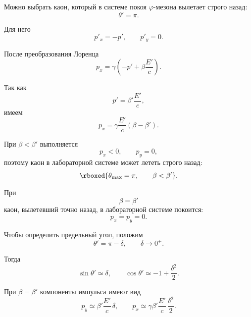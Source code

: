 \documentclass[../final.tex]{subfiles}
\begin{document}
Можно выбрать каон, который в системе покоя $\varphi$-мезона
вылетает строго назад:
%
\begin{equation*}
    \theta'=\pi.
\end{equation*}

Для него
%
\begin{equation*}
    p'_x=-p',
    \qquad
    p'_y=0.
\end{equation*}

После преобразования Лоренца
%
\begin{equation*}
    p_x
    =
    \gamma
    \left(
        -p'
        +
        \beta\frac{E'}{c}
    \right).
\end{equation*}

Так как
%
\begin{equation*}
    p'
    =
    \beta'\frac{E'}{c},
\end{equation*}
%
имеем
%
\begin{equation*}
    p_x
    =
    \gamma\frac{E'}{c}
    (\beta-\beta').
\end{equation*}

При $\beta<\beta'$ выполняется
%
\begin{equation*}
    p_x<0,
    \qquad
    p_y=0,
\end{equation*}
%
поэтому каон в лабораторной системе может лететь строго назад:
%
\begin{equation*}
    \rboxed{
        \theta_{\max}=\pi,
        \qquad
        \beta<\beta'
    }.
\end{equation*}

При
%
\begin{equation*}
    \beta=\beta'
\end{equation*}
%
каон, вылетевший точно назад, в лабораторной системе покоится:
%
\begin{equation*}
    p_x=p_y=0.
\end{equation*}

Чтобы определить предельный угол, положим
%
\begin{equation*}
    \theta'
    =
    \pi-\delta,
    \qquad
    \delta\rightarrow0^+.
\end{equation*}

Тогда
%
\begin{equation*}
    \sin\theta'
    \simeq
    \delta,
    \qquad
    \cos\theta'
    \simeq
    -1+\frac{\delta^2}{2}.
\end{equation*}

При $\beta=\beta'$ компоненты импульса имеют вид
%
\begin{equation*}
    p_y
    \simeq
    \beta'\frac{E'}{c}\,\delta,
    \qquad
    p_x
    \simeq
    \gamma\beta'\frac{E'}{c}\,
    \frac{\delta^2}{2}.
\end{equation*}
\end{document}
